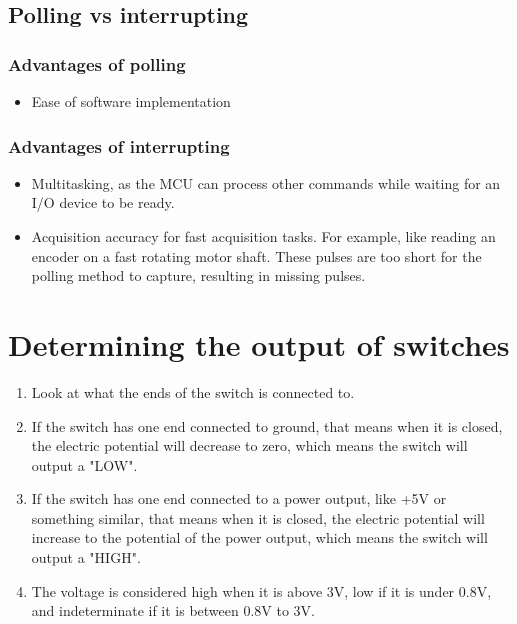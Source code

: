 \documentclass[11pt]{article}
\begin{document}
\subsection{Polling vs interrupting}
\label{sec:org9fb951e}

\subsubsection{Advantages of polling}
\label{sec:org07f8704}
\begin{itemize}
\item Ease of software implementation
\end{itemize}

\subsubsection{Advantages of interrupting}
\label{sec:org57168a0}
\begin{itemize}
\item Multitasking, as the MCU can process other commands while waiting for an I/O device to be ready.
\item Acquisition accuracy for fast acquisition tasks. For example, like reading an encoder on a fast rotating motor shaft. These pulses are too short for the polling method to capture, resulting in missing pulses.
\end{itemize}

\section{Determining the output of switches}
\label{sec:orgc11dbba}
\begin{enumerate}
\item Look at what the ends of the switch is connected to.
\item If the switch has one end connected to ground, that means when it is closed, the electric potential will decrease to zero, which means the switch will output a "LOW".
\item If the switch has one end connected to a power output, like +5V or something similar, that means when it is closed, the electric potential will increase to the potential of the power output, which means the switch will output a "HIGH".
\item The voltage is considered high when it is above 3V, low if it is under 0.8V, and indeterminate if it is between 0.8V to 3V.
\end{enumerate}
\end{document}

